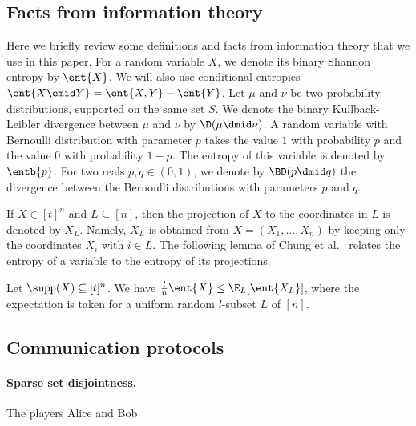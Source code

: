 \subsection{Facts from information theory}
Here we briefly review some definitions and facts from
information theory that we use in this paper. For a random
variable $X$, we denote its binary Shannon entropy by $\ent{X}$.
We will also use conditional entropies $\ent{X\emid
Y}=\ent{X,Y}-\ent{Y}$. Let $\mu$ and $\nu$ be two probability
distributions, supported on the same set $S$. We denote the
binary Kullback-Leibler divergence between $\mu$ and $\nu$ by
$\D(\mu\dmid \nu)$. A random variable with Bernoulli
distribution with parameter $p$ takes the value $1$ with
probability $p$ and the value $0$ with probability $1-p$. The
entropy of this variable is denoted by $\entb{p}$. For two reals
$p,q\in (0,1)$, we denote by $\BD(p\dmid q)$ the divergence
between the Bernoulli distributions with parameters $p$ and $q$.

If $X\in[t]^n$ and $L\subseteq[n]$, then the projection of $X$
to the coordinates in $L$ is denoted by $X_L$. Namely, $X_L$ is
obtained from $X=(X_1,\ldots,X_n)$ by keeping only the
coordinates $X_i$ with $i\in L$. The following lemma of Chung et
al.~\cite{ChungGFS1986} relates the entropy of a variable to the
entropy of its projections.
\begin{lemma}
\label{lem:ent-subset}
Let $\supp(X)\subseteq[t]^n$. We have
$\frac{l}{n}\ent{X} \leq \E_L[\ent{X_L}]$, where the expectation is taken for
a uniform random $l$-subset $L$ of $[n]$.
\end{lemma}

\subsection{Communication protocols}
\label{sec:comm-protocols}

\paragraph{Sparse set disjointness.}
The players Alice and Bob
